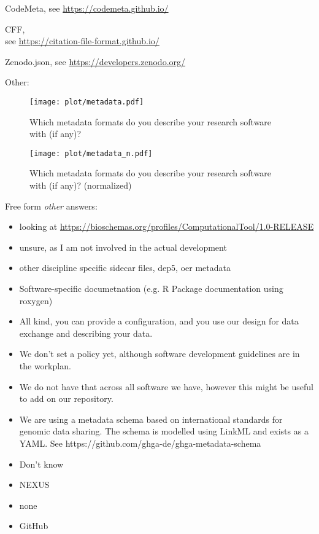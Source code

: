 \documentclass[headsepline,titlepage,twoside,12pt,toc=flat,headings=normal]{scrreprt}
\newcommand{\otherbox}{\fbox{\phantom{This is how big an answer would be.}}}
\begin{document}
\begin{answers}
\item CodeMeta, see \url{https://codemeta.github.io/}
\item \acf{CFF},\\see \url{https://citation-file-format.github.io/}
\item Zenodo.json, see \url{https://developers.zenodo.org/}
\item Other: \otherbox
\end{answers}

\begin{figure}[h!]
\caption{Which metadata formats do you describe your research software with (if any)?}
\label{fig:metadata}
\texttt{[image: plot/metadata.pdf]}
\end{figure}

\begin{figure}[h!]
\caption{Which metadata formats do you describe your research software with (if any)? (normalized)}
\label{fig:metadata_n}
\texttt{[image: plot/metadata\_n.pdf]}
\end{figure}

Free form \emph{other} answers:
\begin{itemize}
\item looking at \url{https://bioschemas.org/profiles/ComputationalTool/1.0-RELEASE}
\item unsure, as I am not involved in the actual development
\item other discipline specific sidecar files, dep5, oer metadata
\item Software-specific documetnation (e.g. R Package documentation using roxygen)
\item All kind, you can provide a configuration, and you use our design for data exchange and describing your data.
\item We don't set a policy yet, although software development guidelines are in the workplan.
\item We do not have that across all software we have, however this might be useful to add on our repository.
\item We are using a metadata schema based on international standards for genomic data sharing. The schema is modelled using LinkML and exists as a YAML. See https://github.com/ghga-de/ghga-metadata-schema
\item Don't know
\item NEXUS
\item none
\item GitHub
\end{itemize}
\end{document}
